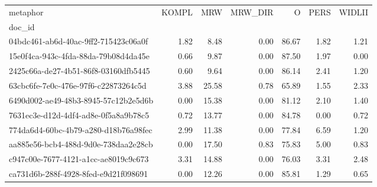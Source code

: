 \begin{tabular}{lrrrrrr}
\toprule
metaphor & KOMPL & MRW & MRW\_DIR & O & PERS & WIDLII \\
doc_id &  &  &  &  &  &  \\
\midrule
04bdc461-ab6d-40ac-9ff2-715423c06a0f & 1.82 & 8.48 & 0.00 & 86.67 & 1.82 & 1.21 \\
15e0f4ca-943c-4fda-88da-79b08d4da45e & 0.66 & 9.87 & 0.00 & 87.50 & 1.97 & 0.00 \\
2425c66a-de27-4b51-86f8-03160dfb5445 & 0.60 & 9.64 & 0.00 & 86.14 & 2.41 & 1.20 \\
63cbc6fe-7e0c-476e-97f6-c22873264c5d & 3.88 & 25.58 & 0.78 & 65.89 & 1.55 & 2.33 \\
6490d002-ae49-48b3-8945-57c12b2e5d6b & 0.00 & 15.38 & 0.00 & 81.12 & 2.10 & 1.40 \\
7631ec3e-d12d-4df4-ad8e-0f5a8a9b78c5 & 0.72 & 13.77 & 0.00 & 84.78 & 0.00 & 0.72 \\
774da6d4-60bc-4b79-a280-d18b76a98fec & 2.99 & 11.38 & 0.00 & 77.84 & 6.59 & 1.20 \\
aa885e56-bcb4-488d-9d0e-738daa2e28cb & 0.00 & 17.50 & 0.83 & 75.83 & 5.00 & 0.83 \\
c947c00e-7677-4121-a1cc-ae8019c9c673 & 3.31 & 14.88 & 0.00 & 76.03 & 3.31 & 2.48 \\
ca731d6b-288f-4928-8fed-e9d21f098691 & 0.00 & 12.26 & 0.00 & 85.81 & 1.29 & 0.65 \\
\bottomrule
\end{tabular}
